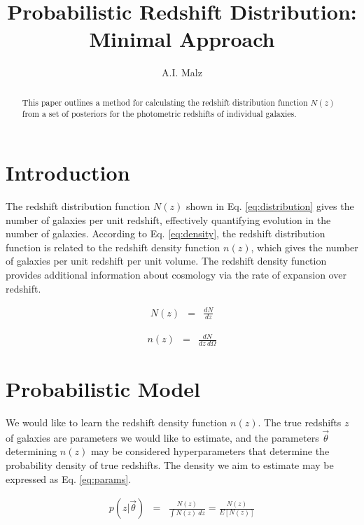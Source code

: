 \documentclass[12pt, onecolumn]{emulateapj}
\begin{document}
\title{Probabilistic Redshift Distribution: Minimal Approach}

\author{A.I. Malz}

\begin{abstract}
This paper outlines a method for calculating the redshift distribution function $N(z)$ from a set of posteriors for the photometric redshifts of individual galaxies.
\end{abstract}


\section{Introduction}

The redshift distribution function $N(z)$ shown in Eq. \ref{eq:distribution} gives the number of galaxies per unit redshift, effectively quantifying evolution in the number of galaxies.  \citep{men13}  According to Eq. \ref{eq:density}, the redshift distribution function is related to the redshift density function $n(z)$, which gives the number of galaxies per unit redshift per unit volume.  The redshift density function provides additional information about cosmology via the rate of expansion over redshift.

\begin{eqnarray}
\label{eq:distribution}
N(z) &=& \frac{dN}{dz}
\end{eqnarray}

\begin{eqnarray}
\label{eq:density}
n(z) &=& \frac{dN}{dz\ d\Omega}
\end{eqnarray}

\section{Probabilistic Model}

We would like to learn the redshift density function $n(z)$.  The true redshifts $z$ of galaxies are parameters we would like to estimate, and the parameters $\vec{\theta}$ determining $n(z)$ may be considered hyperparameters that determine the probability density of true redshifts.  The density we aim to estimate may be expressed as Eq. \ref{eq:params}.

\begin{eqnarray}
\label{eq:params}
p(z|\vec{\theta}) &=& \frac{N(z)}{\int N(z)\ dz} = \frac{N(z)}{E[N(z)]}
\end{eqnarray}
\end{document}
